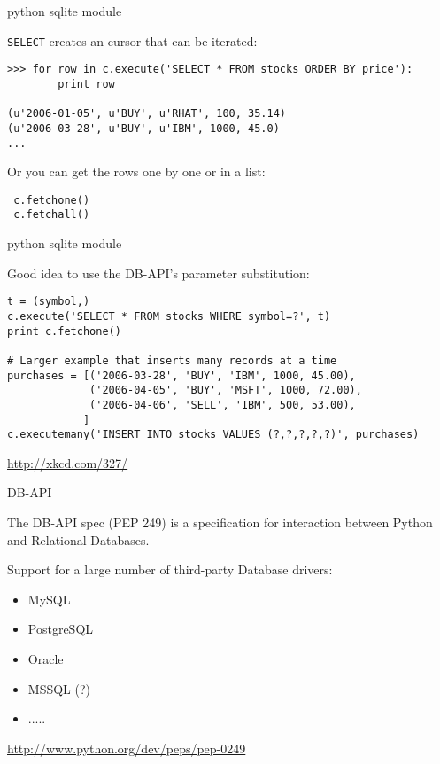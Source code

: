 \documentclass{beamer}
\begin{document}
\begin{frame}[fragile]{python sqlite module}

{\large \verb|SELECT| creates an cursor that can be iterated:}

\begin{verbatim}
>>> for row in c.execute('SELECT * FROM stocks ORDER BY price'):
        print row

(u'2006-01-05', u'BUY', u'RHAT', 100, 35.14)
(u'2006-03-28', u'BUY', u'IBM', 1000, 45.0)
...
\end{verbatim}

{\large Or you can get the rows one by one or in a list:}

\begin{verbatim}
 c.fetchone()
 c.fetchall()
\end{verbatim}

\end{frame} 


\begin{frame}[fragile]{python sqlite module}

\vfill
{\large Good idea to use the DB-API’s parameter substitution:}

\begin{verbatim}
t = (symbol,)
c.execute('SELECT * FROM stocks WHERE symbol=?', t)
print c.fetchone()

# Larger example that inserts many records at a time
purchases = [('2006-03-28', 'BUY', 'IBM', 1000, 45.00),
             ('2006-04-05', 'BUY', 'MSFT', 1000, 72.00),
             ('2006-04-06', 'SELL', 'IBM', 500, 53.00),
            ]
c.executemany('INSERT INTO stocks VALUES (?,?,?,?,?)', purchases)
\end{verbatim}

\vfill
\url{http://xkcd.com/327/}
\end{frame} 

\begin{frame}[fragile]{DB-API}

\vfill
{\Large The DB-API spec (PEP 249) is a specification for interaction between Python and Relational Databases.}

\vfill
{\Large Support for a large number of third-party Database drivers:
\begin{itemize}
  \item MySQL
  \item PostgreSQL
  \item Oracle
  \item MSSQL (?)
  \item .....
\end{itemize}
}
\vfill
\url{http://www.python.org/dev/peps/pep-0249}
\end{frame} 
\end{document}
